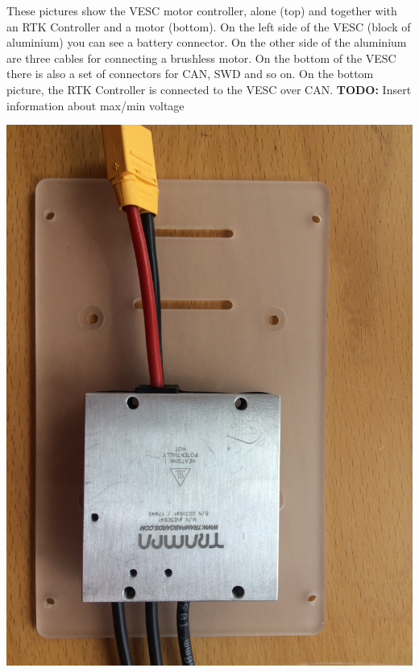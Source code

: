 \documentclass[12pt]{article} %
\newcommand{\todo}[1]{{\color{red} \textbf{TODO:} #1}}
\begin{document}
\vspace{5mm}

\noindent \begin{minipage}{0.66\textwidth} These pictures show the VESC
  motor controller, alone (top) and together with an RTK Controller
  and a motor (bottom). On the left side of the VESC (block of
  aluminium) you can see a battery connector.  On the other side of
  the aluminium are three cables for connecting a brushless motor.  On
  the bottom of the VESC there is also a set of connectors for CAN,
  SWD and so on. On the bottom picture, the RTK Controller is
  connected to the VESC over CAN.
  \todo{Insert information about max/min voltage} 
\end{minipage}
\begin{minipage}{0.33\textwidth} %
  \noindent \includegraphics[width=\textwidth]{./photos/VESC.JPG}

\end{minipage}
\end{document}
